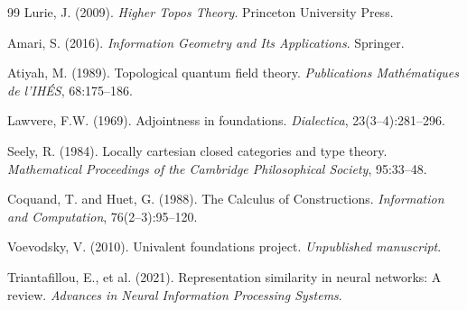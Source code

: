 \documentclass[12pt,a4paper]{article}
\theoremstyle{plain}
\theoremstyle{definition}
\begin{document}
\begin{thebibliography}{99}
 Lurie, J. (2009). \textit{Higher Topos Theory}. Princeton University Press.

 Amari, S. (2016). \textit{Information Geometry and Its Applications}. Springer.

 Atiyah, M. (1989). Topological quantum field theory. \textit{Publications Math\'{e}matiques de l'IH\'{E}S}, 68:175--186.

 Lawvere, F.W. (1969). Adjointness in foundations. \textit{Dialectica}, 23(3--4):281--296.

 Seely, R. (1984). Locally cartesian closed categories and type theory. \textit{Mathematical Proceedings of the Cambridge Philosophical Society}, 95:33--48.

 Coquand, T. and Huet, G. (1988). The Calculus of Constructions. \textit{Information and Computation}, 76(2--3):95--120.

 Voevodsky, V. (2010). Univalent foundations project. \textit{Unpublished manuscript}.

 Triantafillou, E., et al. (2021). Representation similarity in neural networks: A review. \textit{Advances in Neural Information Processing Systems}.

\end{thebibliography}
\end{document}

